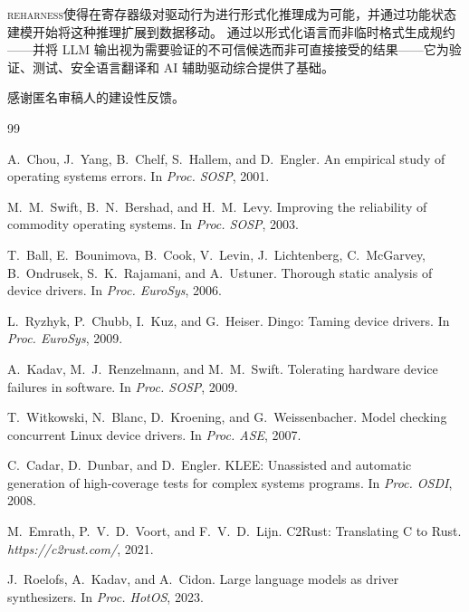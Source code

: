 \documentclass[sigplan, screen, review, anonymous]{acmart}
\newcommand{\reharness}{\textsc{reharness}}
\begin{document}
\reharness 使得在寄存器级对驱动行为进行形式化推理成为可能，并通过功能状态建模开始将这种推理扩展到数据移动。 通过以形式化语言而非临时格式生成规约——并将 LLM 输出视为需要验证的不可信候选而非可直接接受的结果——它为验证、测试、安全语言翻译和 AI 辅助驱动综合提供了基础。

\begin{acks}
感谢匿名审稿人的建设性反馈。
\end{acks}


\begin{thebibliography}{99}

A.~Chou, J.~Yang, B.~Chelf, S.~Hallem, and D.~Engler.
\newblock An empirical study of operating systems errors.
\newblock In \emph{Proc. SOSP}, 2001.

M.~M.~Swift, B.~N.~Bershad, and H.~M.~Levy.
\newblock Improving the reliability of commodity operating systems.
\newblock In \emph{Proc. SOSP}, 2003.

T.~Ball, E.~Bounimova, B.~Cook, V.~Levin, J.~Lichtenberg, C.~McGarvey, B.~Ondrusek, S.~K.~Rajamani, and A.~Ustuner.
\newblock Thorough static analysis of device drivers.
\newblock In \emph{Proc. EuroSys}, 2006.

L.~Ryzhyk, P.~Chubb, I.~Kuz, and G.~Heiser.
\newblock Dingo: Taming device drivers.
\newblock In \emph{Proc. EuroSys}, 2009.

A.~Kadav, M.~J.~Renzelmann, and M.~M.~Swift.
\newblock Tolerating hardware device failures in software.
\newblock In \emph{Proc. SOSP}, 2009.

T.~Witkowski, N.~Blanc, D.~Kroening, and G.~Weissenbacher.
\newblock Model checking concurrent Linux device drivers.
\newblock In \emph{Proc. ASE}, 2007.

C.~Cadar, D.~Dunbar, and D.~Engler.
\newblock KLEE: Unassisted and automatic generation of high-coverage tests for complex systems programs.
\newblock In \emph{Proc. OSDI}, 2008.

M.~Emrath, P.~V.~D.~Voort, and F.~V.~D.~Lijn.
\newblock C2Rust: Translating C to Rust.
\newblock \emph{https://c2rust.com/}, 2021.

J.~Roelofs, A.~Kadav, and A.~Cidon.
\newblock Large language models as driver synthesizers.
\newblock In \emph{Proc. HotOS}, 2023.


\end{thebibliography}
\end{document}
